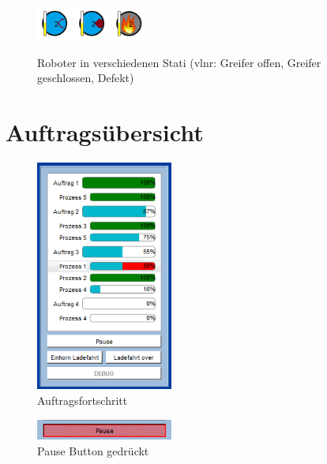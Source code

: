 \begin{figure}[htb]
    \centering
    \includegraphics[width=0.1\textwidth]{Abbildungen/RobotinoGoffen.png}
    \includegraphics[width=0.1\textwidth]{Abbildungen/RobotinoGZu.png}
    \includegraphics[width=0.1\textwidth]{Abbildungen/RobotinoDefect.png}
    \caption{Roboter in verschiedenen Stati (vlnr: Greifer offen, Greifer geschlossen, Defekt)}		
    \label{fig:Robotino}
\end{figure}

\section{Auftragsübersicht}
\label{sec:Auftragsuebersicht}

\begin{figure}[htb]
    \centering
    \includegraphics[width=0.4\textwidth]{Abbildungen/Auftragsfortschritt.png}
    \caption{Auftragsfortschritt}		
    \label{fig:Auftragsfortschritt}
\end{figure}

\begin{figure}[htb]
    \centering
    \includegraphics[width=0.4\textwidth]{Abbildungen/Pause.png}
    \caption{Pause Button gedrückt}		
    \label{fig:Pause}
\end{figure}


